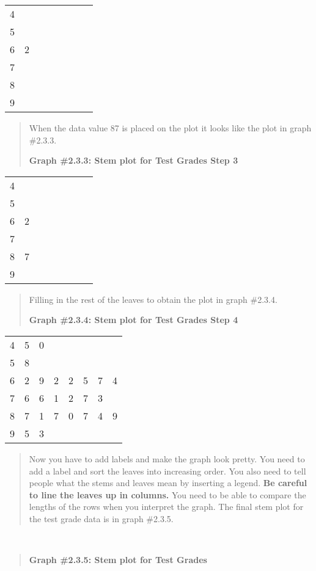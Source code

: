 \documentclass[]{book}
\begin{document}
\begin{longtable}[]{@{}llllllll@{}}
\toprule
\endhead
4 & & & & & & &\tabularnewline
5 & & & & & & &\tabularnewline
6 & 2 & & & & & &\tabularnewline
7 & & & & & & &\tabularnewline
8 & & & & & & &\tabularnewline
9 & & & & & & &\tabularnewline
\bottomrule
\end{longtable}

\begin{quote}
When the data value 87 is placed on the plot it looks like the plot in
graph \#2.3.3.

\textbf{Graph \#2.3.3: Stem plot for Test Grades Step 3}
\end{quote}

\begin{longtable}[]{@{}llllllll@{}}
\toprule
\endhead
4 & & & & & & &\tabularnewline
5 & & & & & & &\tabularnewline
6 & 2 & & & & & &\tabularnewline
7 & & & & & & &\tabularnewline
8 & 7 & & & & & &\tabularnewline
9 & & & & & & &\tabularnewline
\bottomrule
\end{longtable}

\begin{quote}
Filling in the rest of the leaves to obtain the plot in graph \#2.3.4.

\textbf{Graph \#2.3.4: Stem plot for Test Grades Step 4}
\end{quote}

\begin{longtable}[]{@{}llllllll@{}}
\toprule
\endhead
4 & 5 & 0 & & & & &\tabularnewline
5 & 8 & & & & & &\tabularnewline
6 & 2 & 9 & 2 & 2 & 5 & 7 & 4\tabularnewline
7 & 6 & 6 & 1 & 2 & 7 & 3 &\tabularnewline
8 & 7 & 1 & 7 & 0 & 7 & 4 & 9\tabularnewline
9 & 5 & 3 & & & & &\tabularnewline
\bottomrule
\end{longtable}

\begin{quote}
Now you have to add labels and make the graph look pretty. You need to
add a label and sort the leaves into increasing order. You also need
to tell people what the stems and leaves mean by inserting a legend.
\textbf{Be careful to line the leaves up in columns.} You need to be able
to compare the lengths of the rows when you interpret the graph. The
final stem plot for the test grade data is in graph \#2.3.5.
\end{quote}

\textbf{\\
}

\begin{quote}
\textbf{Graph \#2.3.5: Stem plot for Test Grades}
\end{quote}
\end{document}
